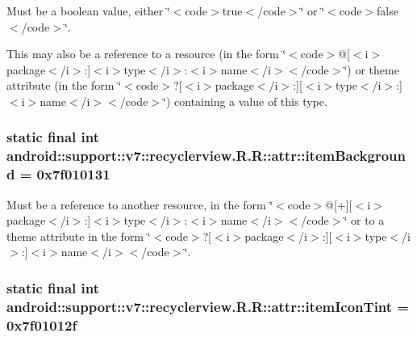 Must be a boolean value, either \char`\"{}$<$code$>$true$<$/code$>$\char`\"{} or \char`\"{}$<$code$>$false$<$/code$>$\char`\"{}. 

This may also be a reference to a resource (in the form \char`\"{}$<$code$>$@\mbox{[}$<$i$>$package$<$/i$>$:\mbox{]}$<$i$>$type$<$/i$>$:$<$i$>$name$<$/i$>$$<$/code$>$\char`\"{}) or theme attribute (in the form \char`\"{}$<$code$>$?\mbox{[}$<$i$>$package$<$/i$>$:\mbox{]}\mbox{[}$<$i$>$type$<$/i$>$:\mbox{]}$<$i$>$name$<$/i$>$$<$/code$>$\char`\"{}) containing a value of this type. \hypertarget{classandroid_1_1support_1_1v7_1_1recyclerview_1_1_r_1_1attr_f84c2f15e277a8421048d0079667be9e}{
\subsubsection[{itemBackground}]{\setlength{\rightskip}{0pt plus 5cm}static final int android::support::v7::recyclerview.R.R::attr::itemBackground = 0x7f010131}}
\label{classandroid_1_1support_1_1v7_1_1recyclerview_1_1_r_1_1attr_f84c2f15e277a8421048d0079667be9e}


Must be a reference to another resource, in the form \char`\"{}$<$code$>$@\mbox{[}+\mbox{]}\mbox{[}$<$i$>$package$<$/i$>$:\mbox{]}$<$i$>$type$<$/i$>$:$<$i$>$name$<$/i$>$$<$/code$>$\char`\"{} or to a theme attribute in the form \char`\"{}$<$code$>$?\mbox{[}$<$i$>$package$<$/i$>$:\mbox{]}\mbox{[}$<$i$>$type$<$/i$>$:\mbox{]}$<$i$>$name$<$/i$>$$<$/code$>$\char`\"{}. \hypertarget{classandroid_1_1support_1_1v7_1_1recyclerview_1_1_r_1_1attr_c36cdab9e882429726f7499b28d40323}{
\subsubsection[{itemIconTint}]{\setlength{\rightskip}{0pt plus 5cm}static final int android::support::v7::recyclerview.R.R::attr::itemIconTint = 0x7f01012f}}
\label{classandroid_1_1support_1_1v7_1_1recyclerview_1_1_r_1_1attr_c36cdab9e882429726f7499b28d40323}


